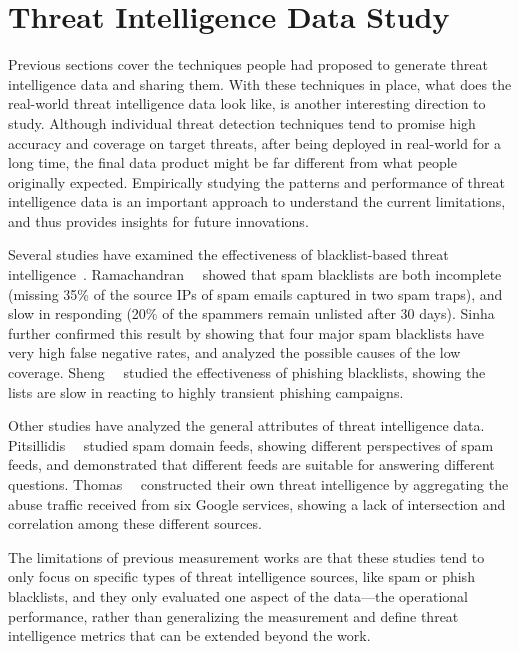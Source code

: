 \section{Threat Intelligence Data Study}
\label{sec:threat_intel_data}

Previous sections cover the techniques people had proposed to generate
threat intelligence data and sharing them. With these 
techniques in place, what does the real-world threat intelligence 
data look like, is another interesting direction to study. Although 
individual threat detection techniques tend to promise high accuracy and
coverage on target threats, after being deployed in real-world for a long
time, the final data product might be far different from what 
people originally expected. Empirically studying the patterns and 
performance of threat intelligence data is an important approach to 
understand the current limitations, and thus provides insights for future 
innovations.

Several studies have examined the effectiveness of blacklist-based 
threat intelligence~\cite{kuhrer2014paint, ramachandran2006revealing, 
ramachandran2007filtering, sheng2009empirical, sinha2008shades}.
Ramachandran~\etal~\cite{ramachandran2007filtering} showed that spam 
blacklists are both incomplete (missing 35\% of the source IPs of 
spam emails captured in two spam traps), and slow in responding 
(20\% of the spammers remain unlisted after 30 days).
Sinha~\etal~\cite{sinha2008shades} further confirmed this result by 
showing that four major spam blacklists have very high false negative
rates, and analyzed the possible causes of the low coverage.
Sheng~\etal~\cite{sheng2009empirical} studied the effectiveness of
phishing blacklists, showing the lists are slow in reacting to
highly transient phishing campaigns.

Other studies have analyzed the general attributes of threat
intelligence data. Pitsillidis~\etal~\cite{tasters:imc12} studied
spam domain feeds, showing different perspectives
of spam feeds, and demonstrated that different feeds are suitable for
answering different questions. Thomas~\etal~\cite{thomas2016abuse}
constructed their own threat intelligence by aggregating the abuse
traffic received from six Google services, showing a lack of
intersection and correlation among these different sources. 

The limitations of previous measurement works are that these 
studies tend to only focus on specific types of threat intelligence 
sources, like spam or phish blacklists, and they only evaluated one 
aspect of the data---the operational performance, 
rather than generalizing the measurement and define threat intelligence 
metrics that can be extended beyond the work.

